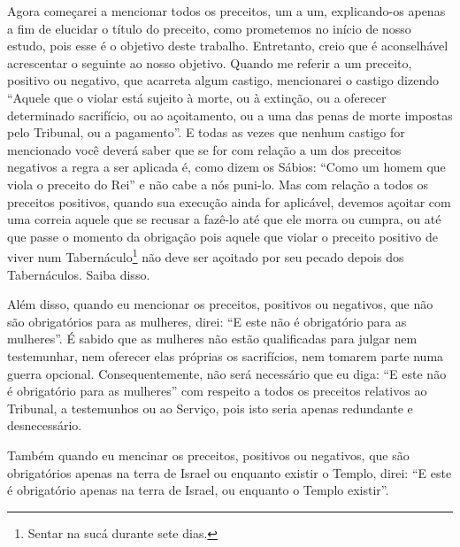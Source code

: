 Agora começarei a mencionar todos os preceitos, um a um, explicando-os
apenas a fim de elucidar o título do preceito, como prometemos no início
de nosso estudo, pois esse é o objetivo deste trabalho. Entretanto,
creio que é aconselhável acrescentar o seguinte ao nosso objetivo.
Quando me referir a um preceito, positivo ou negativo, que acarreta
algum castigo, mencionarei o castigo dizendo ``Aquele que o violar está
sujeito à morte, ou à extinção, ou a oferecer determinado sacrifício, ou
ao açoitamento, ou a uma das penas de morte impostas pelo Tribunal, ou a
pagamento''. E todas as vezes que nenhum castigo for mencionado você
deverá saber que se for com relação a um dos preceitos negativos a regra
a ser aplicada é, como dizem os Sábios: ``Como um homem que viola o
preceito do Rei'' e não cabe a nós puni-lo. Mas com relação a todos os
preceitos positivos, quando sua execução ainda for aplicável, devemos
açoitar com uma correia aquele que se recusar a fazê-lo até que
ele morra ou cumpra, ou até que passe o momento da obrigação pois aquele
que violar o preceito positivo de viver num
Tabernáculo\footnote{Sentar na sucá\starr{} durante sete dias.} não deve ser açoitado por seu pecado depois dos Tabernáculos. Saiba disso.

Além disso, quando eu mencionar os preceitos, positivos ou negativos,
que não são obrigatórios para as mulheres, direi: ``E este não é
obrigatório para as mulheres''. É sabido que as mulheres não estão
qualificadas para julgar nem testemunhar, nem oferecer elas próprias os
sacrifícios, nem tomarem parte numa guerra opcional. Consequentemente,
não será necessário que eu diga: ``E este não é obrigatório para as
mulheres'' com respeito a todos os preceitos relativos ao Tribunal, a
testemunhos ou ao Serviço, pois isto seria apenas redundante e
desnecessário.

Também quando eu mencinar os preceitos, positivos ou negativos, que são
obrigatórios apenas na terra de Israel ou enquanto existir o Templo,
direi: ``E este é obrigatório apenas na terra de Israel, ou enquanto o
Templo existir''.

